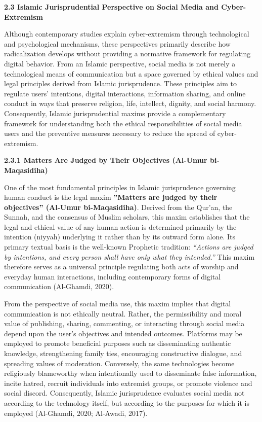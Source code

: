 \documentclass[11pt,a4paper]{article}
\begin{document}
	\textbf{2.3 Islamic Jurisprudential Perspective on Social Media and Cyber-Extremism}
	
	Although contemporary studies explain cyber-extremism through technological and psychological mechanisms, these perspectives primarily describe how radicalization develops without providing a normative framework for regulating digital behavior. From an Islamic perspective, social media is not merely a technological means of communication but a space governed by ethical values and legal principles derived from Islamic jurisprudence. These principles aim to regulate users' intentions, digital interactions, information sharing, and online conduct in ways that preserve religion, life, intellect, dignity, and social harmony. Consequently, Islamic jurisprudential maxims provide a complementary framework for understanding both the ethical responsibilities of social media users and the preventive measures necessary to reduce the spread of cyber-extremism.
	
	\textbf{2.3.1 Matters Are Judged by Their Objectives (Al-Umur bi-Maqasidiha)}
	
	One of the most fundamental principles in Islamic jurisprudence governing human conduct is the legal maxim \textbf{''Matters are judged by their objectives'' (Al-Umur bi-Maqasidiha)}. Derived from the Qur'an, the Sunnah, and the consensus of Muslim scholars, this maxim establishes that the legal and ethical value of any human action is determined primarily by the intention (niyyah) underlying it rather than by its outward form alone. Its primary textual basis is the well-known Prophetic tradition: \textit{``Actions are judged by intentions, and every person shall have only what they intended.''} This maxim therefore serves as a universal principle regulating both acts of worship and everyday human interactions, including contemporary forms of digital communication (Al-Ghamdi, 2020).
	
	From the perspective of social media use, this maxim implies that digital communication is not ethically neutral. Rather, the permissibility and moral value of publishing, sharing, commenting, or interacting through social media depend upon the user's objectives and intended outcomes. Platforms may be employed to promote beneficial purposes such as disseminating authentic knowledge, strengthening family ties, encouraging constructive dialogue, and spreading values of moderation. Conversely, the same technologies become religiously blameworthy when intentionally used to disseminate false information, incite hatred, recruit individuals into extremist groups, or promote violence and social discord. Consequently, Islamic jurisprudence evaluates social media not according to the technology itself, but according to the purposes for which it is employed (Al-Ghamdi, 2020; Al-Awadi, 2017).
	
\end{document}
